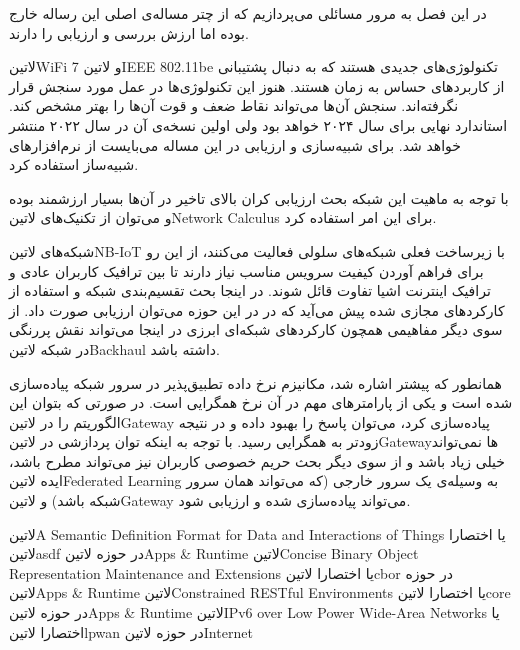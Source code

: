 
در این فصل به مرور مسائلی می‌پردازیم که از چتر مساله‌ی اصلی این رساله خارج بوده اما ارزش بررسی و ارزیابی را دارند.



‌لاتین{WiFi 7} و ‌لاتین{IEEE 802.11be} تکنولوژی‌های جدیدی هستند که به دنبال پشتیبانی از کاربردهای حساس به زمان هستند. هنوز این تکنولوژی‌ها در عمل مورد سنجش قرار نگرفته‌اند.
سنجش آن‌ها می‌تواند نقاط ضعف و قوت آن‌ها را بهتر مشخص کند. استاندارد نهایی برای سال ۲۰۲۴ خواهد بود ولی اولین نسخه‌ی آن در سال ۲۰۲۲ منتشر خواهد شد. برای شبیه‌سازی و ارزیابی در این
مساله می‌بایست از نرم‌افزارهای شبیه‌ساز استفاده کرد.

با توجه به ماهیت این شبکه بحث ارزیابی کران بالای تاخیر در آن‌ها بسیار ارزشمند بوده و می‌توان از تکنیک‌های ‌لاتین{Network Calculus} برای این امر استفاده کرد.


شبکه‌های ‌لاتین{NB-IoT} با زیرساخت فعلی شبکه‌های سلولی فعالیت می‌کنند، از این رو برای فراهم آوردن کیفیت سرویس مناسب نیاز دارند تا بین ترافیک کاربران عادی
و ترافیک اینترنت اشیا تفاوت قائل شوند. در اینجا بحث تقسیم‌بندی شبکه و استفاده از کارکردهای مجازی شده پیش می‌آید که در در این حوزه می‌توان ارزیابی صورت داد.
از سوی دیگر مفاهیمی همچون کارکردهای شبکه‌ای ابرزی در اینجا می‌تواند نقش پررنگی در شبکه ‌لاتین{Backhaul} داشته باشد.


همانطور که پیشتر اشاره شد، مکانیزم نرخ داده تطبیق‌پذیر در سرور شبکه پیاده‌سازی شده است و یکی از پارامترهای مهم در آن نرخ همگرایی است.
در صورتی که بتوان این الگوریتم را در ‌لاتین{Gateway} پیاده‌سازی کرد، می‌توان پاسخ را بهبود داده و در نتیجه زودتر به همگرایی رسید.
با توجه به اینکه توان پردازشی در ‌لاتین{Gateway}ها نمی‌تواند خیلی زیاد باشد و از سوی دیگر بحث حریم خصوصی کاربران نیز می‌تواند مطرح باشد،
ایده ‌لاتین{Federated Learning} به وسیله‌ی یک سرور خارجی (که می‌تواند همان سرور شبکه باشد) و ‌لاتین{Gateway} می‌تواند پیاده‌سازی شده
و ارزیابی شود.


 ‌لاتین{A Semantic Definition Format for Data and Interactions of Things} یا اختصارا ‌لاتین{asdf} در حوزه ‌لاتین{Apps \& Runtime}
 ‌لاتین{Concise Binary Object Representation Maintenance and Extensions} یا اختصارا ‌لاتین{cbor} در حوزه ‌لاتین{Apps \& Runtime}
 ‌لاتین{Constrained RESTful Environments} یا اختصارا ‌لاتین{core} در حوزه ‌لاتین{Apps \& Runtime}
 ‌لاتین{IPv6 over Low Power Wide-Area Networks} یا اختصارا ‌لاتین{lpwan} در حوزه ‌لاتین{Internet}

